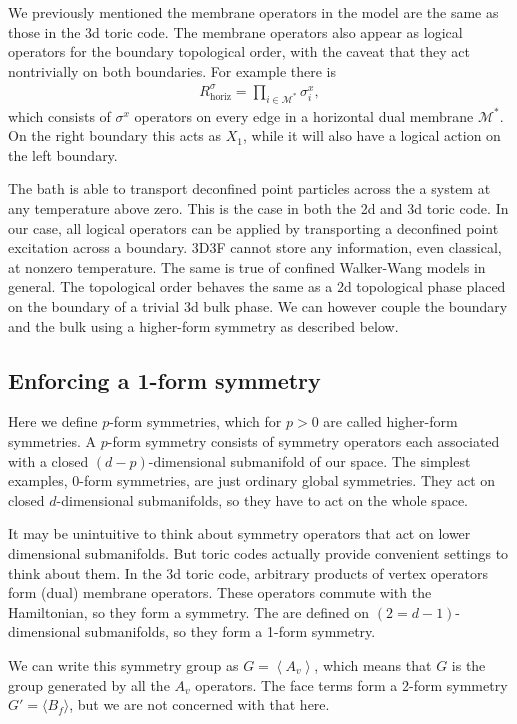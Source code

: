 \documentclass[twocolumn, longbibliography]{revtex4-2}
\newcommand{\horiz}{\text{horiz}}
\begin{document}
We previously mentioned the membrane operators in the model are the same as those in the 3d toric code. The membrane operators also appear as logical operators for the boundary topological order, with the caveat that they act nontrivially on both boundaries. For example there is 
\begin{align}
R^\sigma_\horiz = \prod_{i\in \mathcal{M}^*} \sigma^x_i,
\end{align}
which consists of $\sigma^x$ operators on every edge in a horizontal dual membrane $\mathcal{M}^*$. On the right boundary this acts as $X_1$, while it will also have a logical action on the left boundary.

The bath is able to transport deconfined point particles across the a system at any temperature above zero. This is the case in both the 2d and 3d toric code. In our case, all logical operators can be applied by transporting a deconfined point excitation across a boundary. 3D3F cannot store any information, even classical, at nonzero temperature. The same is true of confined Walker-Wang models in general. The topological order behaves the same as a 2d topological phase placed on the boundary of a trivial 3d bulk phase. We can however couple the boundary and the bulk using a higher-form symmetry as described below.

\subsection{Enforcing a 1-form symmetry} \label{sub:1form}

Here we define $p$-form symmetries, which for $p>0$ are called higher-form symmetries. A $p$-form symmetry consists of symmetry operators each associated with a closed $(d-p)$-dimensional submanifold of our space. The simplest examples, 0-form symmetries, are just ordinary global symmetries. They act on closed $d$-dimensional submanifolds, so they have to act on the whole space.
	
It may be unintuitive to think about symmetry operators that act on lower dimensional submanifolds. But toric codes actually provide convenient settings to think about them. In the 3d toric code, arbitrary products of vertex operators form (dual) membrane operators. These operators commute with the Hamiltonian, so they form a symmetry. The are defined on $(2=d-1)$-dimensional submanifolds, so they form a 1-form symmetry. 

We can write this symmetry group as $G=\left\langle A_v\right \rangle$, which means that $G$ is the group generated by all the $A_v$ operators.
The face terms form a 2-form symmetry $G'=\langle B_f\rangle$, but we are not concerned with that here.
\end{document}
